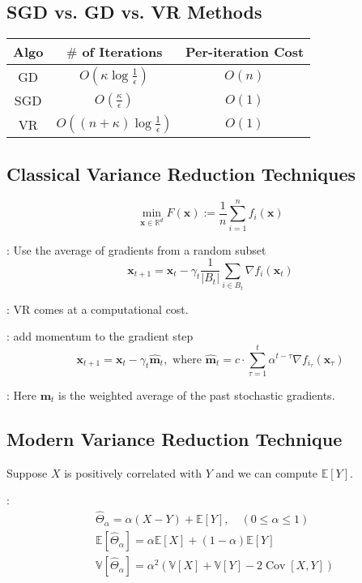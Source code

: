 \subsection*{SGD vs. GD vs. VR Methods}
\begin{tabular}{c|c|c} 
Algo & $\#$ of Iterations & Per-iteration Cost \\
\hline \hline GD & $O\left(\kappa \log \frac{1}{\epsilon}\right)$ & $O(n)$ \\
SGD & $O\left(\frac{\kappa}{\epsilon}\right)$ & $O(1)$ \\
VR & $O\left((n+\kappa) \log \frac{1}{\epsilon}\right)$ & $O(1)$ \\
\hline \hline
\end{tabular}







\subsection*{Classical Variance Reduction Techniques}
$$
\min _{\mathbf{x} \in \mathbb{R}^{d}} F(\mathbf{x}):=\frac{1}{n} \sum_{i=1}^{n} f_{i}(\mathbf{x})
$$

: Use the average of gradients from a random subset
$$
\mathbf{x}_{t+1}=\mathbf{x}_{t}-\gamma_{t} \frac{1}{\left|B_{t}\right|} \sum_{i \in B_{t}} \nabla f_{i}\left(\mathbf{x}_{t}\right)
$$

: VR comes at a computational cost.

: add momentum to the gradient step
$$
\mathbf{x}_{t+1}=\mathbf{x}_{t}-\gamma_{t} \hat{\mathbf{m}}_{t}, \text { where } \hat{\mathbf{m}}_{t}=c \cdot \sum_{\tau=1}^{t} \alpha^{t-\tau} \nabla f_{i_{\tau}}\left(\mathbf{x}_{\tau}\right)
$$

: Here $\mathbf{m}_{t}$ is the weighted average of the past stochastic gradients.







\subsection*{Modern Variance Reduction Technique}
Suppose $X$ is positively correlated with $Y$ and we can compute $\mathbb{E}[Y]$.

:
$$
\begin{aligned}
&\hat{\Theta}_{\alpha}=\alpha(X-Y)+\mathbb{E}[Y], \quad(0 \leq \alpha \leq 1) \\
&\mathbb{E}\left[\hat{\Theta}_{\alpha}\right]=\alpha \mathbb{E}[X]+(1-\alpha) \mathbb{E}[Y] \\
&\mathbb{V}\left[\hat{\Theta}_{\alpha}\right]=\alpha^{2}(\mathbb{V}[X]+\mathbb{V}[Y]-2 \operatorname{Cov}[X, Y])
\end{aligned}
$$

